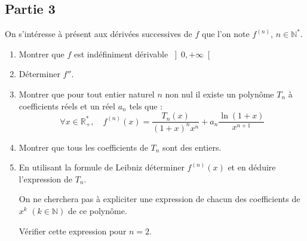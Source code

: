 \documentclass[a4paper,french,11pt,twoside]{VcCours}
\begin{document}
\medskip

\subsection*{Partie 3}

\medskip

\noindent On s'intéresse à présent aux dérivées successives de $f$ que l'on note
$f^{\left(  n\right)  }$, $n\in\mathbb{N}^*$.

\begin{enumerate}
\item Montrer que $f$ est indéfiniment dérivable $\left]  0,+\infty\right[  $

\item Déterminer $f''$.

\item Montrer que pour tout entier naturel $n$ non nul il existe un polyn\^ome
$T_{n}$ à coefficients réels et un réel $a_{n}$ tels que :%
\[
\forall x\in\mathbb{R}_{+}^{*},\quad f^{\left(  n\right)  }\left(
x\right)  =\dfrac{T_{n}\left(  x\right)  }{\left(  1+x\right)  ^{n}x^{n}%
}+a_{n}\dfrac{\ln\left(  1+x\right)  }{x^{n+1}}%
\]


\item Montrer que tous les coefficients de $T_{n}$ sont des entiers.

\item En utilisant la formule de Leibniz déterminer $f^{\left(  n\right)
}\left(  x\right)  $ et en déduire l'expression de $T_{n}$.

On ne cherchera pas à expliciter une expression de chacun des coefficients de
$x^{k}$ $\left(  k\in\mathbb{N}\right)  $ de ce polyn\^ome.

Vérifier  cette expression pour $n=2$.
\end{enumerate}
\end{document}
